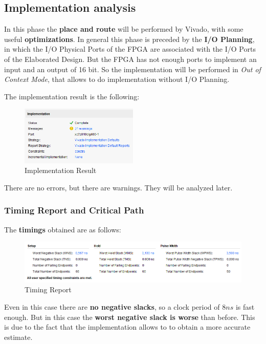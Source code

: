 \subsection{Implementation analysis}

In this phase the \textbf{place and route} will be performed by Vivado, with some useful \textbf{optimizations}. In general this phase is preceded by the \textbf{I/O Planning}, in which the I/O Physical Ports of the FPGA are associated with the I/O Ports of the Elaborated Design. But the FPGA has not enough ports to implement an input and an output of 16 bit. So the implementation will be performed in \textit{Out of Context Mode}, that allows to do implementation without I/O Planning. 

The implementation result is the following:

\begin{figure}[H]
    \centering
    \includegraphics[width=0.5\textwidth]{img/Chapter5/ImplementationResult.png}
    \caption{Implementation Result}
    \label{fig:IR}
\end{figure}

There are no errors, but there are warnings. They will be analyzed later.

\subsubsection{Timing Report and Critical Path}

The \textbf{timings} obtained are as follows:

\begin{figure}[H]
    \centering
    \includegraphics[width=1\textwidth]{img/Chapter5/ImplementationTiming.png}
    \caption{Timing Report}
    \label{fig:ITR}
\end{figure}

Even in this case there are \textbf{no negative slacks}, so a clock period of $8ns$ is fast enough. But in this case the \textbf{worst negative slack is worse} than before. This is due to the fact that the implementation allows to to obtain a more accurate estimate.

